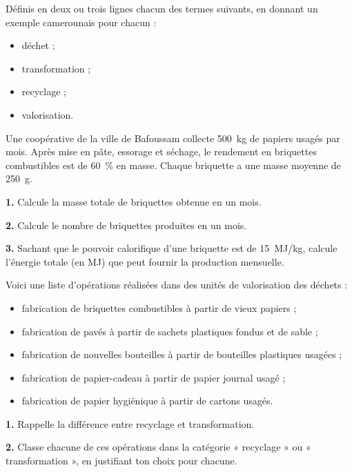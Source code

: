 \documentclass[11pt]{article}
\newcounter{popsec}
\newcounter{popsub}
\newcommand{\courssub}[1]{%
  \stepcounter{popsub}%
  \par\vspace{9pt}\noindent{\popxbold\fontsize{11.5}{13}\selectfont\color{popink}{\color{poporange}\thepopsec.\thepopsub}\hspace{6pt}#1}\par\nopagebreak\vspace{4pt}
}
\begin{document}
\begin{exercice}[Définitions]
Définis en deux ou trois lignes chacun des termes suivants, en donnant un exemple camerounais pour chacun :
\begin{itemize}
\item déchet ;
\item transformation ;
\item recyclage ;
\item valorisation.
\end{itemize}
\end{exercice}

\begin{exercice}
Une coopérative de la ville de Bafoussam collecte \SI{500}{kg} de papiers usagés par mois. Après mise en pâte, essorage et séchage, le rendement en briquettes combustibles est de \SI{60}{\%} en masse. Chaque briquette a une masse moyenne de \SI{250}{g}.

\textbf{1.} Calcule la masse totale de briquettes obtenue en un mois.

\textbf{2.} Calcule le nombre de briquettes produites en un mois.

\textbf{3.} Sachant que le pouvoir calorifique d'une briquette est de \SI{15}{MJ/kg}, calcule l'énergie totale (en \si{MJ}) que peut fournir la production mensuelle.
\end{exercice}

\courssub{Je m'entraîne}

\begin{exercice}
Voici une liste d'opérations réalisées dans des unités de valorisation des déchets :
\begin{itemize}
\item[a)] fabrication de briquettes combustibles à partir de vieux papiers ;
\item[b)] fabrication de pavés à partir de sachets plastiques fondus et de sable ;
\item[c)] fabrication de nouvelles bouteilles à partir de bouteilles plastiques usagées ;
\item[d)] fabrication de papier-cadeau à partir de papier journal usagé ;
\item[e)] fabrication de papier hygiénique à partir de cartons usagés.
\end{itemize}

\textbf{1.} Rappelle la différence entre recyclage et transformation.

\textbf{2.} Classe chacune de ces opérations dans la catégorie « recyclage » ou « transformation », en justifiant ton choix pour chacune.
\end{exercice}
\end{document}
